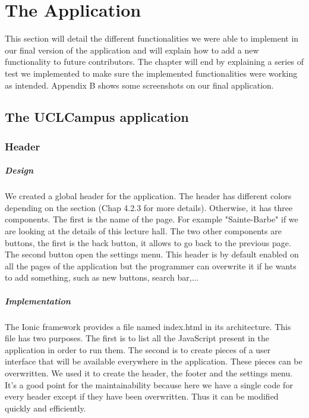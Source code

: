\documentclass{eplmastersthesis}
\begin{document}
\newpage

\chapter{The Application}

This section will detail the different functionalities we were able to implement in our final version of the application and will explain how to add a new functionality to future contributors. The chapter will end by explaining a series of test we implemented to make sure the implemented functionalities were working as intended. Appendix B shows some screenshots on our final application.

\section{The UCLCampus application}

\subsection{Header}
\paragraph{Design}
We created a global header for the application. The header has different colors depending on the section (Chap 4.2.3 for more details). Otherwise, it has three components. The first is the name of the page. For example "Sainte-Barbe" if we are looking at the details of this lecture hall. The two other components are buttons, the first is the back button, it allows to go back to the previous page. The second button open the settings menu. This header is by default enabled on all the pages of the application but the programmer can overwrite it if he wants to add something, such as new buttons, search bar,...
\paragraph{Implementation}
The Ionic framework provides a file named index.html in its architecture. This file has two purposes. The first is to list all the JavaScript present in the application in order to run them. The second is to create pieces of a user interface that will be available everywhere in the application. These pieces can be overwritten. We used it to create the header, the footer and the settings menu. It's a good point for the maintainability because here we have a single code for every header except if they have been overwritten. Thus it can be modified quickly and efficiently. 
\end{document}
